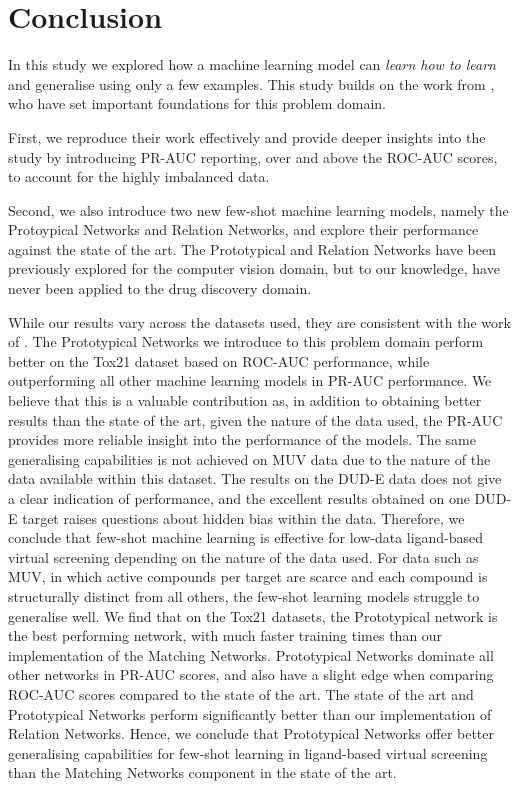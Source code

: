 \section{Conclusion}

In this study we explored how a machine learning model can \textit{learn how to learn} and generalise using only a few examples. This study builds on the work from \citet{altae2017low}, who have set important foundations for this problem domain. 

First, we reproduce their work effectively and provide deeper insights into the study by introducing PR-AUC reporting, over and above the ROC-AUC scores, to account for the highly imbalanced data. 

Second, we also introduce two new few-shot machine learning models, namely the Protoypical Networks and Relation Networks, and explore their performance against the state of the art. The Prototypical and Relation Networks have been previously explored for the computer vision domain, but to our knowledge, have never been applied to the drug discovery domain. 

While our results vary across the datasets used, they are consistent with the work of \citet{altae2017low}. The Prototypical Networks we introduce to this problem domain perform better on the Tox21 dataset based on ROC-AUC performance, while outperforming all other machine learning models in PR-AUC performance. We believe that this is a valuable contribution as, in addition to obtaining better results than the state of the art, given the nature of the data used, the PR-AUC provides more reliable insight into the performance of the models. The same generalising capabilities is not achieved on MUV data due to the nature of the data available within this dataset. The results on the DUD-E data does not give a clear indication of performance, and the excellent results obtained on one DUD-E target raises questions about hidden bias within the data. Therefore, we conclude that few-shot machine learning is effective for low-data ligand-based virtual screening depending on the nature of the data used. For data such as MUV, in which active compounds per target are scarce and each compound is structurally distinct from all others, the few-shot learning models struggle to generalise well. We find that on the Tox21 datasets, the Prototypical network is the best performing network, with much faster training times than our implementation of the Matching Networks. Prototypical Networks dominate all other networks in PR-AUC scores, and also have a slight edge when comparing ROC-AUC scores compared to the state of the art. The state of the art and Prototypical Networks perform significantly better than our implementation of Relation Networks. Hence, we conclude that Prototypical Networks offer better generalising capabilities for few-shot learning in ligand-based virtual screening than the Matching Networks component in the state of the art.

